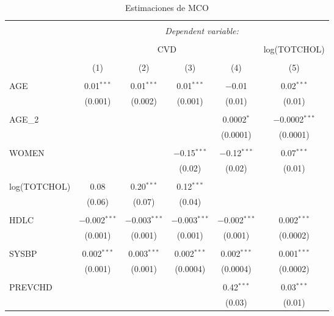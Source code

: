 
\begin{table}[!htbp] \centering 
  \caption{Estimaciones de MCO} 
  \label{tab:tabla_regresiones} 
\footnotesize 
\begin{tabular}{@{\extracolsep{1pt}}lccccc} 
\\[-1.8ex]\hline 
\hline \\[-1.8ex] 
 & \multicolumn{5}{c}{\textit{Dependent variable:}} \\ 
\cline{2-6} 
\\[-1.8ex] & \multicolumn{4}{c}{CVD} & log(TOTCHOL) \\ 
\\[-1.8ex] & (1) & (2) & (3) & (4) & (5)\\ 
\hline \\[-1.8ex] 
 AGE & 0.01$^{***}$ & 0.01$^{***}$ & 0.01$^{***}$ & $-$0.01 & 0.02$^{***}$ \\ 
  & (0.001) & (0.002) & (0.001) & (0.01) & (0.01) \\ 
  & & & & & \\ 
 AGE\_2 &  &  &  & 0.0002$^{*}$ & $-$0.0002$^{***}$ \\ 
  &  &  &  & (0.0001) & (0.0001) \\ 
  & & & & & \\ 
 WOMEN &  &  & $-$0.15$^{***}$ & $-$0.12$^{***}$ & 0.07$^{***}$ \\ 
  &  &  & (0.02) & (0.02) & (0.01) \\ 
  & & & & & \\ 
 log(TOTCHOL) & 0.08 & 0.20$^{***}$ & 0.12$^{***}$ &  &  \\ 
  & (0.06) & (0.07) & (0.04) &  &  \\ 
  & & & & & \\ 
 HDLC & $-$0.002$^{***}$ & $-$0.003$^{***}$ & $-$0.003$^{***}$ & $-$0.002$^{***}$ & 0.002$^{***}$ \\ 
  & (0.001) & (0.001) & (0.001) & (0.001) & (0.0002) \\ 
  & & & & & \\ 
 SYSBP & 0.002$^{***}$ & 0.003$^{***}$ & 0.002$^{***}$ & 0.002$^{***}$ & 0.001$^{***}$ \\ 
  & (0.001) & (0.001) & (0.0004) & (0.0004) & (0.0002) \\ 
  & & & & & \\ 
 PREVCHD &  &  &  & 0.42$^{***}$ & 0.03$^{***}$ \\ 
  &  &  &  & (0.03) & (0.01) \\ 

\end{tabular}
\end{table}
